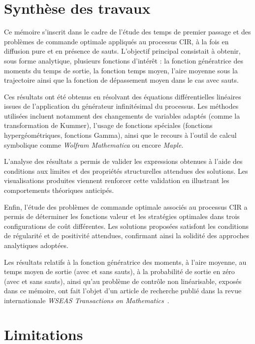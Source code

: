 \label{sec:Conclusion}
\section{Synthèse des travaux}

Ce mémoire s'inscrit dans le cadre de l'étude des temps de premier passage et des problèmes de commande optimale appliqués au processus \acs{CIR}, à la fois en diffusion pure et en présence de sauts. L'objectif principal consistait à obtenir, sous forme analytique, plusieurs fonctions d'intérêt : la fonction génératrice des moments du temps de sortie, la fonction temps moyen, l'aire moyenne sous la trajectoire ainsi que la fonction de dépassement moyen dans le cas avec sauts.

Ces résultats ont été obtenus en résolvant des équations différentielles linéaires issues de l'application du générateur infinitésimal du processus. Les méthodes utilisées incluent notamment des changements de variables adaptés (comme la transformation de Kummer), l'usage de fonctions spéciales (fonctions hypergéométriques, fonctions Gamma), ainsi que le recours à l'outil de calcul symbolique comme \textit{Wolfram Mathematica} ou encore \textit{Maple}.

L'analyse des résultats a permis de valider les expressions obtenues à l'aide des conditions aux limites et des propriétés structurelles attendues des solutions. Les visualisations produites viennent renforcer cette validation en illustrant les comportements théoriques anticipés.

Enfin, l'étude des problèmes de commande optimale associés au processus \acs{CIR} a permis de déterminer les fonctions valeur et les stratégies optimales dans trois configurations de coût différentes. Les solutions proposées satisfont les conditions de régularité et de positivité attendues, confirmant ainsi la solidité des approches analytiques adoptées.

Les résultats relatifs à la fonction génératrice des moments, à l'aire moyenne, au temps moyen de sortie (avec et sans sauts), à la probabilité de sortie en zéro (avec et sans sauts), ainsi qu'au problème de contrôle non linéarisable, exposés dans ce mémoire, ont fait l'objet d'un article de recherche publié dans la revue internationale \textit{WSEAS Transactions on Mathematics}~\cite{lefebvre2025}.

\section{Limitations}

